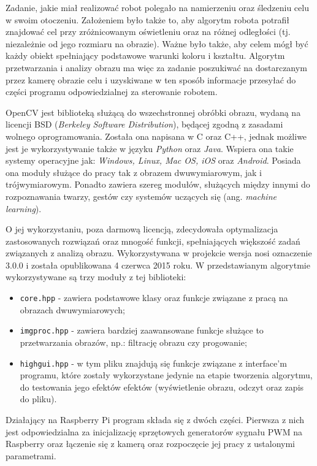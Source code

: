 Zadanie, jakie miał realizować robot polegało na namierzeniu oraz śledzeniu celu w swoim otoczeniu. Założeniem było także to, aby algorytm robota potrafił znajdować cel przy zróżnicowanym oświetleniu oraz na różnej odległości (tj. niezależnie od jego rozmiaru na obrazie). Ważne było także, aby celem mógł być każdy obiekt spełniający podstawowe warunki koloru i kształtu. Algorytm przetwarzania i analizy obrazu ma więc za zadanie poszukiwać na dostarczanym przez kamerę obrazie celu i uzyskiwane w ten sposób informacje przesyłać do części programu odpowiedzialnej za sterowanie robotem.

OpenCV jest biblioteką służącą do wszechstronnej obróbki obrazu, wydaną na licencji BSD (\textit{Berkeley Software Distribution}), będącej zgodną z zasadami wolnego oprogramowania. Została ona napisana w C oraz C++, jednak możliwe jest je wykorzystywanie także w języku \textit{Python} oraz \textit{Java}. Wspiera ona takie systemy operacyjne jak: \textit{Windows, Linux, Mac OS, iOS} oraz \textit{Android}. Posiada ona moduły służące do pracy tak z obrazem dwuwymiarowym, jak i trójwymiarowym. Ponadto zawiera szereg modułów, służących między innymi do rozpoznawania twarzy, gestów czy systemów uczących się (ang. \textit{machine learning}).

O jej wykorzystaniu, poza darmową licencją, zdecydowała optymalizacja zastosowanych rozwiązań oraz mnogość funkcji, spełniających większość zadań związanych z analizą obrazu. Wykorzystywana w projekcie wersja nosi oznaczenie 3.0.0 i została opublikowana 4 czerwca 2015 roku. W przedstawianym algorytmie wykorzystywane są trzy moduły z tej biblioteki:
\begin{itemize}
\item \texttt{core.hpp} - zawiera podstawowe klasy oraz funkcje związane z pracą na obrazach dwuwymiarowych;
\item \texttt{imgproc.hpp} - zawiera bardziej zaawansowane funkcje służące to przetwarzania obrazów, np.: filtrację obrazu czy progowanie;
\item \texttt{highgui.hpp} - w tym pliku znajdują się funkcje związane z interface'm programu, które zostały wykorzystane jedynie na etapie tworzenia algorytmu, do testowania jego efektów efektów (wyświetlenie obrazu, odczyt oraz zapis do pliku).
\end{itemize}

Działający na Raspberry Pi program składa się z dwóch części. Pierwsza z nich jest odpowiedzialna za inicjalizację sprzętowych generatorów sygnału PWM na Raspberry oraz łączenie się z kamerą oraz rozpoczęcie jej pracy z ustalonymi parametrami.

